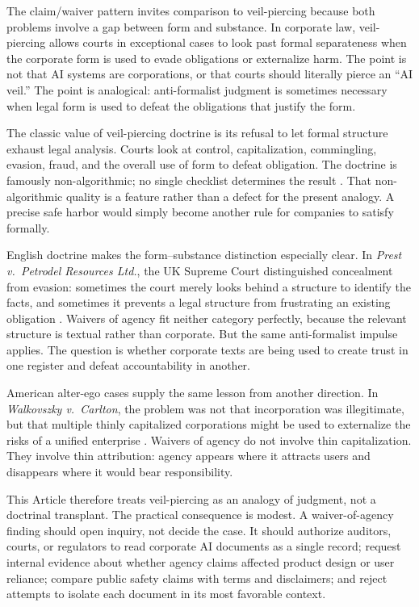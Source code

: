 \documentclass[11pt,a4paper]{article}
\begin{document}
The claim/waiver pattern invites comparison to veil-piercing because both problems involve a gap between form and substance. In corporate law, veil-piercing allows courts in exceptional cases to look past formal separateness when the corporate form is used to evade obligations or externalize harm. The point is not that AI systems are corporations, or that courts should literally pierce an ``AI veil.'' The point is analogical: anti-formalist judgment is sometimes necessary when legal form is used to defeat the obligations that justify the form.

The classic value of veil-piercing doctrine is its refusal to let formal structure exhaust legal analysis. Courts look at control, capitalization, commingling, evasion, fraud, and the overall use of form to defeat obligation. The doctrine is famously non-algorithmic; no single checklist determines the result \citep{thompson1991piercing}. That non-algorithmic quality is a feature rather than a defect for the present analogy. A precise safe harbor would simply become another rule for companies to satisfy formally.

English doctrine makes the form--substance distinction especially clear. In \emph{Prest v.\ Petrodel Resources Ltd.}, the UK Supreme Court distinguished concealment from evasion: sometimes the court merely looks behind a structure to identify the facts, and sometimes it prevents a legal structure from frustrating an existing obligation \citep{prest2013}. Waivers of agency fit neither category perfectly, because the relevant structure is textual rather than corporate. But the same anti-formalist impulse applies. The question is whether corporate texts are being used to create trust in one register and defeat accountability in another.

American alter-ego cases supply the same lesson from another direction. In \emph{Walkovszky v.\ Carlton}, the problem was not that incorporation was illegitimate, but that multiple thinly capitalized corporations might be used to externalize the risks of a unified enterprise \citep{walkovszky1966}. Waivers of agency do not involve thin capitalization. They involve thin attribution: agency appears where it attracts users and disappears where it would bear responsibility.

This Article therefore treats veil-piercing as an analogy of judgment, not a doctrinal transplant. The practical consequence is modest. A waiver-of-agency finding should open inquiry, not decide the case. It should authorize auditors, courts, or regulators to read corporate AI documents as a single record; request internal evidence about whether agency claims affected product design or user reliance; compare public safety claims with terms and disclaimers; and reject attempts to isolate each document in its most favorable context.
\end{document}
